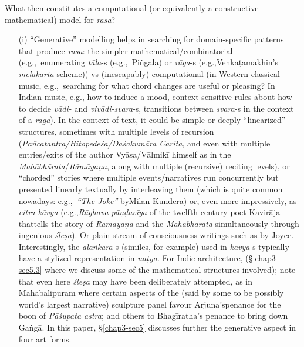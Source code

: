 What then constitutes a computational (or equivalently a constructive mathematical) model for \textsl{rasa}?
\begin{itemize}
\item[(i)] “Generative” modelling helps in searching for domain-specific patterns that produce \textsl{rasa}: the simpler mathematical/combi\-natorial (e.g.,~enumerating \textsl{tāla}-s (e.g.,~Piṅgala) or \textsl{rāga}-s (e.g.,\break Venkaṭamakhin's \textsl{melakarta} scheme)) vs (inescapably) computational (in Western classical music, e.g.,~searching for what chord changes are useful or pleasing? In Indian music, e.g., how to induce a mood, context-sensitive rules about how to decide \textsl{vādi-} and \textsl{vivādi-svara}-s, transitions between \hbox{\textsl{svara}-s} in the context of a \textsl{rāga}). In the context of text, it could be simple or deeply “linearized” structures, sometimes with multiple levels of recursion (\textsl{Pañcatantra/Hitopedeśa/Daśakumāra Carita}, and even with multiple entries/exits of the author Vyāsa/Vālmikī himself as in the \textsl{Mahābhārata}/\textsl{Rāmāyaṇa}, along with multiple (recursive) reciting levels), or “chorded” stories where multiple events/narratives run concurrently but presented linearly textually by interleaving them (which is quite common nowadays: e.g.,~\textsl{“The Joke”} by\break Milan Kundera) or, even more impressively, as \textsl{citra-kāvya} (e.g.,\break \textsl{Rāghava-pāṇḍavīya} of the twelfth-century poet Kavirāja that\break tells the story of \textsl{Rāmāyaṇa} and the \textsl{Mahābhārata} simultaneously through ingenious \textsl{śleṣa}). Or plain stream of consciousness writings such as by Joyce. Interestingly, the \textsl{alaṅkāra-}s (similes, for example) used in \hbox{\textsl{kāvya}-s} typically have a stylized representation in \textsl{nāṭya}. For Indic architecture, (\S\ref{chap3-sec5.3} where we discuss some of the mathematical structures involved); note that even here \textsl{śleṣa} may have been deliberately attempted, as in Mahābalipuram where certain aspects of the (said by some to be possibly world's largest narrative) sculpture panel favour Arjuna’s\break penance for the boon of \textsl{Pāśupata astra}; and others to Bhagīratha’s penance to bring down Gaṅgā. In this paper, \S\ref{chap3-sec5} discusses further the generative aspect in four art forms.


\end{itemize}

